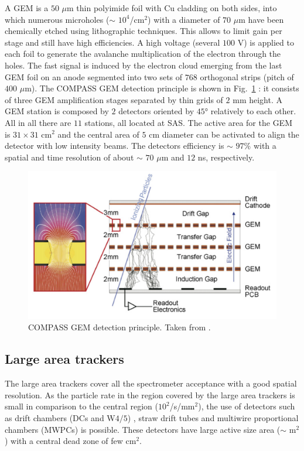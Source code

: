 A GEM is a $50$ $\mu$m thin polyimide foil with Cu cladding on both sides, into which numerous microholes ($\sim$ $10^4$/cm$^2$) with a diameter of $70$ $\mu$m have been chemically etched using lithographic techniques. This allows to limit gain per stage and still have high efficiencies. A high voltage (several $100$ V) is applied to each foil to generate the avalanche multiplication of the electron through the holes. The fast signal is induced by the electron cloud emerging from the last GEM foil on an anode segmented into two sets of $768$ orthogonal strips (pitch of $400$ $\mu$m). The COMPASS GEM detection principle is shown in Fig.~\ref{pic:GEM} : it consists of three GEM amplification stages separated by thin grids of $2$ mm height. A GEM station is composed by $2$ detectors oriented by $45$° relatively to each other. All in all there are $11$ stations, all located at SAS. The active area for the GEM is $31 \times 31$ cm$^2$ and the central area of $5$ cm diameter can be activated to align the detector with low intensity beams. The detectors efficiency is $\sim$ $97$\% with a spatial and time resolution of about $\sim$ $70$ $\mu$m and $12$ ns, respectively.

\begin{figure}[!h]
  \centering
	\includegraphics[scale=0.5]{./gfx/GEM.png}
	\caption{COMPASS GEM detection principle. Taken from \cite{NIM}.}
	\label{pic:GEM}
\end{figure}

\subsection{Large area trackers}

The large area trackers cover all the spectrometer acceptance with a good spatial resolution. As the particle rate in the region covered by the large area trackers is small in comparison to the central region ($10^2$/s/mm$^2$), the use of detectors such as drift chambers (DCs and W$4/5$) \cite{DaCosta}, straw drift tubes \cite{Zvyagin} and multiwire proportional chambers (MWPCs) is possible. These detectors have large active size area ($\sim$ m$^2$) with a central dead zone of few cm$^2$.

